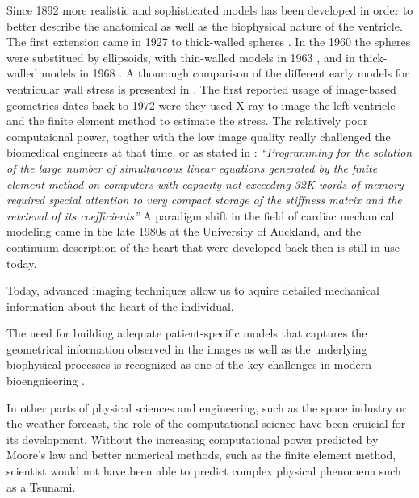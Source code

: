 Since 1892 more realistic and sophisticated models has been developed
in order to better describe the anatomical as well as the biophysical
nature of the ventricle. The first extension came in 1927 to
thick-walled spheres \cite{love2013treatise}. In the 1960 the spheres
were substitued by ellipsoids, with thin-walled models in 1963
\cite{sandler1963left}, and in thick-walled models in 1968
\cite{wong1968stress}. A thourough comparison of the different early
models for ventricular wall stress is presented in
\cite{huisman1980comparison}. The first reported usage of image-based
geometries dates back to 1972 \cite{gould1972vivo} were they used
X-ray to image the left ventricle and the finite element method to
estimate the stress. The relatively poor computaional power, togther
with the low image quality really challenged the biomedical engineers
at that time, or as stated in \cite{heethaar1977computer}:
\emph{``Programming for the solution of the large number of
  simultaneous linear equations generated by the finite element method
  on computers with capacity not exceeding 32K words of memory
  required special attention to very compact storage of the
  stiffness matrix and the retrieval of its coefficients''}
A paradigm shift in the field of cardiac mechanical modeling came in
the late 1980s at the University of Auckland, and the continuum
description of the heart that were developed back
\cite{hunter1988analysis} then is still in use today. 





Today, advanced imaging techniques allow us to aquire detailed
mechanical information about the heart of the individual.



The need for building adequate patient-specific models that captures
the geometrical information observed in the images as well as the
underlying biophysical processes is recognized as one of the key
challenges in modern bioengnieering \cite{hunter2010vision}.



In other parts of physical sciences and engineering, such as the
space industry or the weather forecast, the role of the computational
science have been cruicial for its development. Without the increasing
computational power predicted by Moore's law
\cite{brock2006understanding} and better numerical methods, such as the
finite element method, scientist would not have been able to predict
complex physical phenomena such as a Tsunami.

